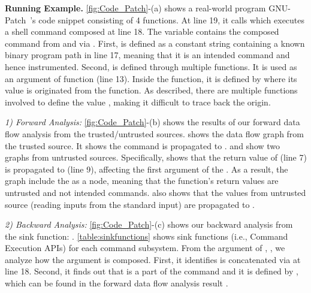 \noindent
\textbf{Running Example.}
\autoref{fig:Code_Patch}-(a) shows a real-world program GNU-Patch~\cite{Patch}'s code snippet consisting of 4 functions. 
At line 19, it calls  which executes a shell command composed at line 18. The  variable contains the composed command from  and  via . 
First,   is defined as a constant string containing a known binary program path in line 17, meaning that it is an intended command and hence instrumented. 
Second,  is defined through multiple functions. It is used as an argument of  function (line 13). Inside the function, it is defined by  where its value is originated from the  function. 
As described, there are multiple functions involved to define the value , making it difficult to trace back the origin. 

{\it 1) Forward Analysis:}
\autoref{fig:Code_Patch}-(b) shows the results of our forward data flow analysis from the trusted/untrusted sources.  shows the data flow graph from the trusted source. It shows the  command is propagated to .
 and  show two graphs from untrusted sources. Specifically,  shows that the return value of  (line 7) is propagated to  (line 9), affecting the first argument of the . As a result, the graph include the  as a node, meaning that the function's return values are untrusted and not intended commands.
 also shows that the values from untrusted source  (reading inputs from the standard input) are propagated to .

{\it 2) Backward Analysis:}
\autoref{fig:Code_Patch}-(c) shows our backward analysis from the sink function: . \autoref{table:sinkfunctions} shows sink functions (i.e., Command Execution APIs) for each command subsystem.
From the argument of , , we analyze how the argument is composed. 
First, it identifies  is concatenated via  at line 18. 
Second, it finds out that  is a part of the command and it is defined by , which can be found in the forward data flow analysis result .

